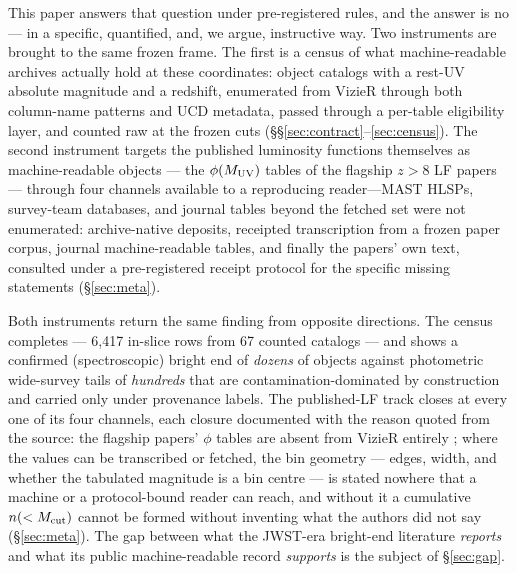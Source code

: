 \documentclass[twocolumn]{aastex702}
\begin{document}
This paper answers that question under pre-registered rules, and the answer is no --- in a
specific, quantified, and, we argue, instructive way. Two instruments are brought to the
same frozen frame. The first is a census of what machine-readable archives actually hold
at these coordinates: object catalogs with a rest-UV absolute magnitude and a redshift,
enumerated from VizieR through both column-name patterns and UCD metadata, passed through
a per-table eligibility layer, and counted raw at the frozen cuts
(\S\S\ref{sec:contract}--\ref{sec:census}). The second instrument targets the published
luminosity functions themselves as machine-readable objects --- the $\phi(M_{\rm UV})$
tables of the flagship $z>8$ LF papers --- through four channels available to a
reproducing reader---MAST HLSPs, survey-team databases, and journal tables beyond the
fetched set were not enumerated: archive-native deposits, receipted transcription from a frozen paper
corpus, journal machine-readable tables, and finally the papers' own text, consulted under
a pre-registered receipt protocol for the specific missing statements
(\S\ref{sec:meta}).

Both instruments return the same finding from opposite directions. The census completes
--- 6{,}417 in-slice rows from 67 counted catalogs --- and shows a confirmed
(spectroscopic) bright end of \emph{dozens} of objects against photometric wide-survey
tails of \emph{hundreds} that are contamination-dominated by construction and carried only
under provenance labels. The published-LF track closes at every one of its four channels,
each closure documented with the reason quoted from the source: the flagship papers'
$\phi$ tables are absent from VizieR entirely \citep[the deposits are object catalogs
without density tables, or nothing at all;][]{harikane23,donnan23,bouwens21,finkelstein15};
where the values can be transcribed or fetched, the bin geometry --- edges, width, and
whether the tabulated magnitude is a bin centre --- is stated nowhere that a machine or a
protocol-bound reader can reach, and without it a cumulative $n(<M_{\rm cut})$ cannot be
formed without inventing what the authors did not say (\S\ref{sec:meta}). The gap between
what the JWST-era bright-end literature \emph{reports} and what its public
machine-readable record \emph{supports} is the subject of \S\ref{sec:gap}.
\end{document}
